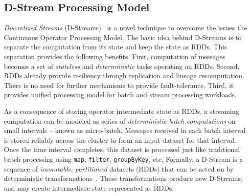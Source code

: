\subsection{D-Stream Processing Model}
\label{sp:dstream-model}

\emph{Discretized Streams} (D-Streams)~\cite{Zaharia:2013} is a novel technique to overcome the issues the Continuous Operator Processing Model. The basic idea behind D-Streams is to separate the computation from its state and keep the state as RDDs. This separation provides the following benefits. First, computation of messages becomes a set of \emph{stateless} and \emph{deterministic} tasks operating on RDDs. Second, RDDs already provide resiliency through replication and lineage recomputation. There is no need for further mechanisms to provide fault-tolerance. Third, it provides unified processing model for batch and stream processing workloads.

As a consequence of storing operator intermediate state as RDDs, a streaming computation can be modeled as series of \emph{deterministic batch computations} on small intervals -- known as micro-batch. Messages received in each batch interval is stored reliably across the cluster to form an input dataset for that interval. Once the time interval completes, this dataset is processed just like traditional batch processing using \lstinline$map$, \lstinline$filter$, \lstinline$groupByKey$, etc. Formally, a D-Stream is a sequence of \emph{immutable}, \emph{partitioned} datasets (RDDs) that can be acted on by deterministic transformations~\cite{Zaharia:2013}. These  transformations produce new D-Streams, and may create intermediate state represented as RDDs.

